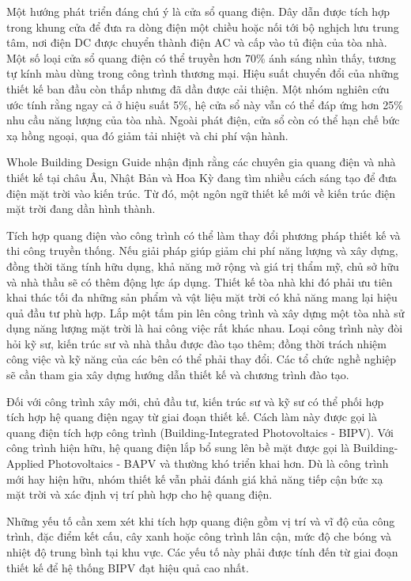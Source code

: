 \documentclass{thesis}
\begin{document}
Một hướng phát triển đáng chú ý là cửa sổ quang điện. Dây dẫn được
tích hợp trong khung cửa để đưa ra dòng điện một chiều hoặc nối tới
bộ nghịch lưu trung tâm, nơi điện DC được chuyển thành điện AC và cấp
vào tủ điện của tòa nhà. Một số loại cửa sổ quang điện có thể truyền
hơn 70\% ánh sáng nhìn thấy, tương tự kính màu dùng trong công trình
thương mại. Hiệu suất chuyển đổi của những thiết kế ban đầu còn thấp
nhưng đã dần được cải thiện. Một nhóm nghiên cứu ước tính rằng ngay
cả ở hiệu suất 5\%, hệ cửa sổ này vẫn có thể đáp ứng hơn 25\% nhu cầu
năng lượng của tòa nhà. Ngoài phát điện, cửa sổ còn có thể hạn chế
bức xạ hồng ngoại, qua đó giảm tải nhiệt và chi phí vận hành.

Whole Building Design Guide nhận định rằng các chuyên gia quang điện
và nhà thiết kế tại châu Âu, Nhật Bản và Hoa Kỳ đang tìm nhiều cách
sáng tạo để đưa điện mặt trời vào kiến trúc. Từ đó, một ngôn ngữ
thiết kế mới về kiến trúc điện mặt trời đang dần hình thành.

Tích hợp quang điện vào công trình có thể làm thay đổi phương pháp
thiết kế và thi công truyền thống. Nếu giải pháp giúp giảm chi phí
năng lượng và xây dựng, đồng thời tăng tính hữu dụng, khả năng mở
rộng và giá trị thẩm mỹ, chủ sở hữu và nhà thầu sẽ có thêm động lực
áp dụng. Thiết kế tòa nhà khi đó phải ưu tiên khai thác tối đa những
sản phẩm và vật liệu mặt trời có khả năng mang lại hiệu quả đầu tư phù hợp.
Lắp một tấm pin lên công trình và xây dựng một tòa nhà sử dụng năng
lượng mặt trời là hai công việc rất khác nhau. Loại công trình này
đòi hỏi kỹ sư, kiến trúc sư và nhà thầu được đào tạo thêm; đồng thời
trách nhiệm công việc và kỹ năng của các bên có thể phải thay đổi.
Các tổ chức nghề nghiệp sẽ cần tham gia xây dựng hướng dẫn thiết kế
và chương trình đào tạo.

Đối với công trình xây mới, chủ đầu tư, kiến trúc sư và kỹ sư có thể
phối hợp tích hợp hệ quang điện ngay từ giai đoạn thiết kế. Cách làm
này được gọi là quang điện tích hợp công trình (Building-Integrated
Photovoltaics - BIPV). Với công trình hiện hữu, hệ quang điện lắp bổ
sung lên bề mặt được gọi là Building-Applied Photovoltaics - BAPV và
thường khó triển khai hơn. Dù là công trình mới hay hiện hữu, nhóm
thiết kế vẫn phải đánh giá khả năng tiếp cận bức xạ mặt trời và xác
định vị trí phù hợp cho hệ quang điện.

Những yếu tố cần xem xét khi tích hợp quang điện gồm vị trí và vĩ độ
của công trình, đặc điểm kết cấu, cây xanh hoặc công trình lân cận,
mức độ che bóng và nhiệt độ trung bình tại khu vực. Các yếu tố này
phải được tính đến từ giai đoạn thiết kế để hệ thống BIPV đạt hiệu quả cao nhất.
\end{document}

